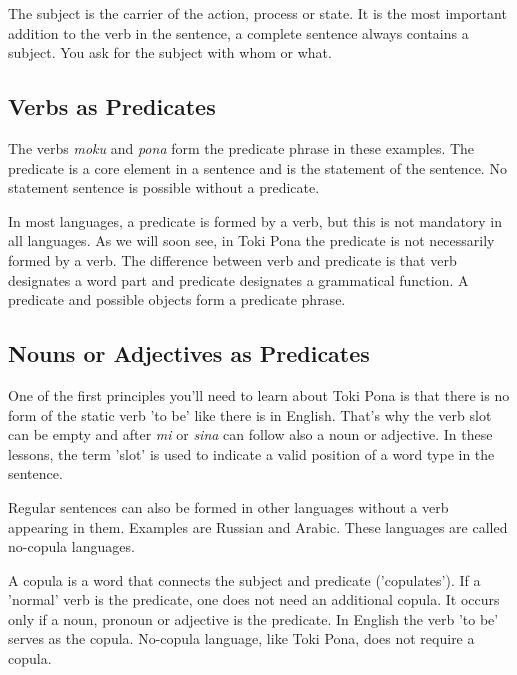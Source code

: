The subject is the carrier of the action, process or state.
It is the most important addition to the verb in the sentence, a complete sentence always contains a subject.
You ask for the subject with whom or what.

\subsection*{Verbs as Predicates}

The verbs \textit{moku} and \textit{pona} form the predicate phrase in these examples.
The predicate is a core element in a sentence and is the statement of the sentence.
No statement sentence is possible without a predicate.

In most languages, a predicate is formed by a verb, but this is not mandatory in all languages.
As we will soon see, in Toki Pona the predicate is not necessarily formed by a verb.
The difference between verb and predicate is that verb designates a word part and predicate designates a grammatical function.
A predicate and possible objects form a predicate phrase.

\subsection*{Nouns or Adjectives as Predicates}

One of the first principles you'll need to learn about Toki Pona is that there is no form of the static verb 'to be' like there is in English.
That's why the verb slot can be empty and after \textit{mi} or \textit{sina} can follow also a noun or adjective.
In these lessons, the term 'slot' is used to indicate a valid position of a word type in the sentence.

Regular sentences can also be formed in other languages without a verb appearing in them.
Examples are Russian and Arabic.
These languages are called no-copula languages.

A copula is a word that connects the subject and predicate ('copulates').
If a 'normal' verb is the predicate, one does not need an additional copula.
It occurs only if a noun, pronoun or adjective is the predicate.
In English the verb 'to be' serves as the copula.
No-copula language, like Toki Pona, does not require a copula.


